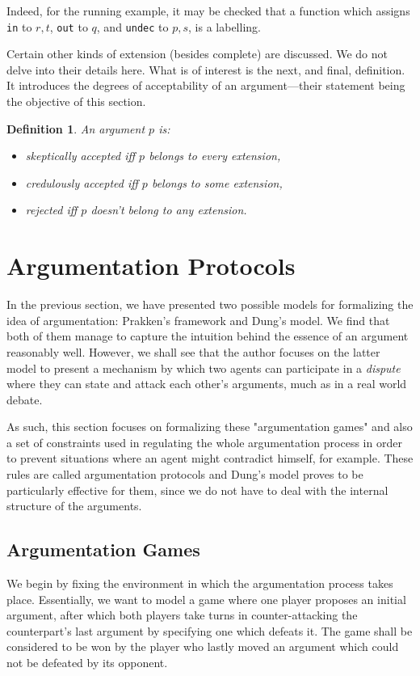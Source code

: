 \documentclass[12pt, a4paper]{article}
\newtheorem{Def}{Definition}[subsection]
\begin{document}
Indeed, for the running example, it may be checked that a function which assigns \texttt{in} to $r, t$, \texttt{out} to $q$, and \texttt{undec} to $p, s$, is a labelling.

Certain other kinds of extension (besides complete) are discussed. We do not delve into their details here. What is of interest is the next, and final, definition. It introduces the degrees of acceptability of an argument---their statement being the objective of this section.

\begin{Def}
An argument $p$ is:
\begin{itemize}
\item \emph{skeptically accepted} iff $p$ belongs to every extension,
\item \emph{credulously accepted} iff $p$ belongs to some extension,
\item \emph{rejected} iff $p$ doesn't belong to any extension.
\end{itemize}
\end{Def}

\newpage



\section{Argumentation Protocols}
In the previous section, we have presented two possible models for formalizing the idea of argumentation: Prakken's framework and Dung's model. We find that both of them manage to  capture the intuition behind the essence of an argument reasonably well. However, we shall see that the author focuses on the latter model to present a mechanism by which two agents can participate in a \emph{dispute} where they can state and attack each other's arguments, much as in a real world debate.

As such, this section focuses on formalizing these "argumentation games" and also a set of constraints used in regulating the whole argumentation process in order to prevent situations where an agent might contradict himself, for example. These rules are called argumentation protocols and Dung's model proves to be particularly effective for them, since we do not have to deal with the internal structure of the arguments.

\subsection{Argumentation Games}
We begin by fixing the environment in which the argumentation process takes place. Essentially, we want to model a game where one player proposes an initial argument, after which both players take turns in counter-attacking the counterpart's last argument by specifying one which defeats it. The game shall be considered to be won by the player who lastly moved an argument which could not be defeated by its opponent.
\end{document}
